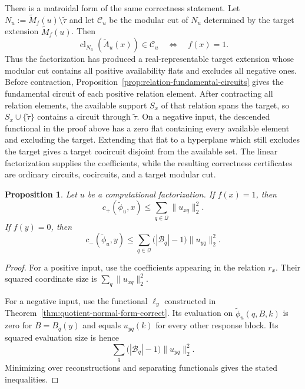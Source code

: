 \documentclass[11pt]{article}
\numberwithin{equation}{section}
\newtheorem{proposition}[definition]{Proposition}
\theoremstyle{remark}
\newcommand{\cl}{\operatorname{cl}}
\begin{document}
There is a matroidal form of the same correctness statement. Let $N_u:=\widetilde M_f(u)\setminus\widetilde\tau$ and let $\mathcal C_u$ be the modular cut of $N_u$ determined by the target
extension $\widetilde M_f(u)$. Then
\begin{equation}
    \cl_{N_u}(\widetilde A_u(x))\in\mathcal C_u
    \quad\Longleftrightarrow\quad
    f(x)=1.
\end{equation}
Thus the factorization has produced a real-representable target extension
whose modular cut contains all positive availability flats and excludes all
negative ones. Before contraction,
Proposition~\ref{prop:relation-fundamental-circuits} gives the fundamental
circuit of each positive relation element. After contracting all relation
elements, the available support $S_x$ of that relation spans the target, so
$S_x\cup\{\widetilde\tau\}$ contains a circuit through $\widetilde\tau$.
On a negative input, the descended functional in
the proof above has a zero flat containing every available element and
excluding the target. Extending that flat to a hyperplane which still
excludes the target gives a target cocircuit disjoint from the available
set. The linear factorization supplies the coefficients, while the resulting
correctness certificates are ordinary circuits, cocircuits, and a target
modular cut.

\begin{proposition}
\label{prop:quotient-normal-form-cost}
Let $u$ be a computational factorization. If $f(x)=1$, then
\begin{equation}
    c_+(\widetilde\phi_u,x)
    \leq
    \sum_{q\in\mathcal Q}\|u_{xq}\|_2^2.
\end{equation}
If $f(y)=0$, then
\begin{equation}
    c_-(\widetilde\phi_u,y)
    \leq
    \sum_{q\in\mathcal Q}
        \bigl(|\mathcal B_q|-1\bigr)
        \|u_{yq}\|_2^2.
\end{equation}
\end{proposition}

\begin{proof}
For a positive input, use the coefficients appearing in the relation
$r_x$. Their squared coordinate size is
$\sum_q\|u_{xq}\|_2^2$.

For a negative input, use the functional $\ell_y$ constructed in
Theorem~\ref{thm:quotient-normal-form-correct}. Its evaluation on
$\widetilde\phi_u(q,B,k)$ is zero for $B=B_q(y)$ and equals
$u_{yq}(k)$ for every other response block. Its squared evaluation size is
hence
\begin{equation}
    \sum_q
        \bigl(|\mathcal B_q|-1\bigr)
        \|u_{yq}\|_2^2.
\end{equation}
Minimizing over reconstructions and separating functionals gives the stated
inequalities.
\end{proof}
\end{document}
